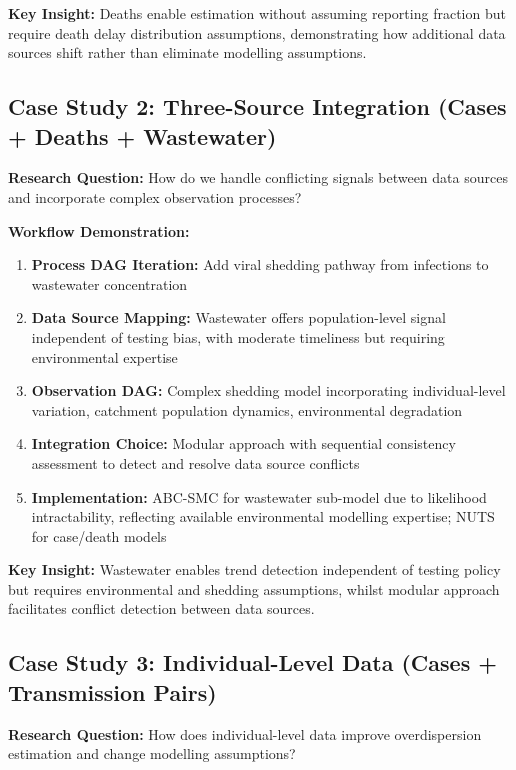\documentclass{article}
\begin{document}
\textbf{Key Insight:} Deaths enable estimation without assuming reporting fraction but require death delay distribution assumptions, demonstrating how additional data sources shift rather than eliminate modelling assumptions.

\subsection{Case Study 2: Three-Source Integration (Cases + Deaths + Wastewater)}

\textbf{Research Question:} How do we handle conflicting signals between data sources and incorporate complex observation processes?

\textbf{Workflow Demonstration:}
\begin{enumerate}
    \item \textbf{Process DAG Iteration:} Add viral shedding pathway from infections to wastewater concentration
    \item \textbf{Data Source Mapping:} Wastewater offers population-level signal independent of testing bias, with moderate timeliness but requiring environmental expertise
    \item \textbf{Observation DAG:} Complex shedding model incorporating individual-level variation, catchment population dynamics, environmental degradation
    \item \textbf{Integration Choice:} Modular approach with sequential consistency assessment to detect and resolve data source conflicts
    \item \textbf{Implementation:} ABC-SMC for wastewater sub-model due to likelihood intractability, reflecting available environmental modelling expertise; NUTS for case/death models
\end{enumerate}

\textbf{Key Insight:} Wastewater enables trend detection independent of testing policy but requires environmental and shedding assumptions, whilst modular approach facilitates conflict detection between data sources.

\subsection{Case Study 3: Individual-Level Data (Cases + Transmission Pairs)}

\textbf{Research Question:} How does individual-level data improve overdispersion estimation and change modelling assumptions?
\end{document}
